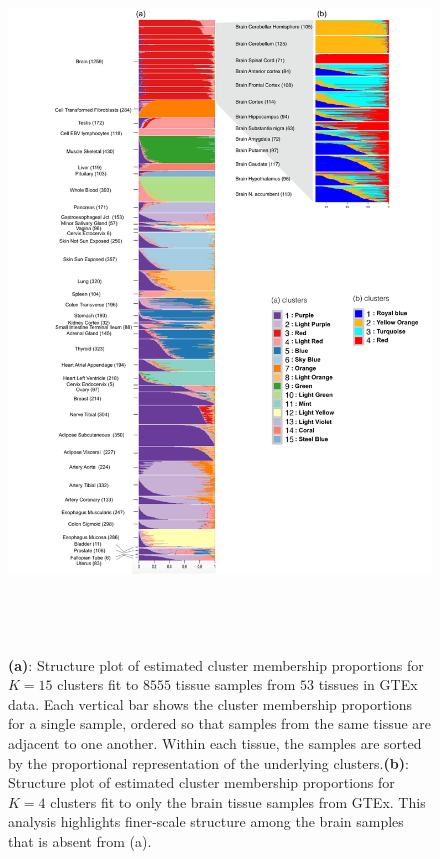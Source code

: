 

\begin{figure}[ht]
\raggedleft
\includegraphics[height=7.5in, width=6.5in]{../plots/gtex-figures/gtex_02_29_16.pdf}
 \caption{ \textbf{(a)}: Structure plot of estimated cluster membership proportions for $K=15$ clusters fit to $8555$ tissue samples from $53$ tissues in GTEx data.  Each vertical bar shows the cluster membership proportions for a single sample, ordered so that samples from the same tissue are adjacent to one another. Within each tissue, the samples are sorted by the proportional representation of the underlying clusters.\textbf{(b)}: Structure plot of estimated cluster membership proportions for $K=4$ clusters fit to only the brain tissue samples from GTEx. This analysis highlights finer-scale structure among the brain samples that is absent from (a).}
\label{fig:fig1}
\end{figure}
